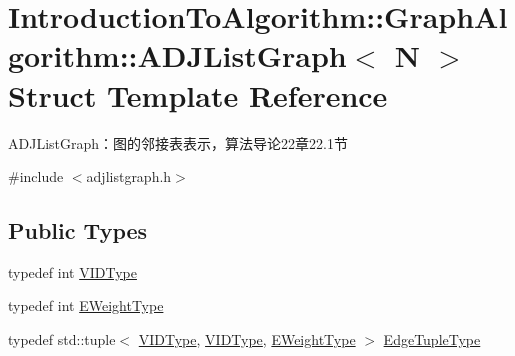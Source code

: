 \hypertarget{struct_introduction_to_algorithm_1_1_graph_algorithm_1_1_a_d_j_list_graph}{}\section{Introduction\+To\+Algorithm\+:\+:Graph\+Algorithm\+:\+:A\+D\+J\+List\+Graph$<$ N $>$ Struct Template Reference}
\label{struct_introduction_to_algorithm_1_1_graph_algorithm_1_1_a_d_j_list_graph}


A\+D\+J\+List\+Graph：图的邻接表表示，算法导论22章22.1节  




{\ttfamily \#include $<$adjlistgraph.\+h$>$}

\subsection*{Public Types}
\begin{DoxyCompactItemize}
\item 
typedef int \hyperlink{struct_introduction_to_algorithm_1_1_graph_algorithm_1_1_a_d_j_list_graph_aa42303d15a6a0e4cf6fad5c1327c1d79}{V\+I\+D\+Type}
\item 
typedef int \hyperlink{struct_introduction_to_algorithm_1_1_graph_algorithm_1_1_a_d_j_list_graph_a8b9518587536b482cfd8c2fc7f5c9678}{E\+Weight\+Type}
\item 
typedef std\+::tuple$<$ \hyperlink{struct_introduction_to_algorithm_1_1_graph_algorithm_1_1_a_d_j_list_graph_aa42303d15a6a0e4cf6fad5c1327c1d79}{V\+I\+D\+Type}, \hyperlink{struct_introduction_to_algorithm_1_1_graph_algorithm_1_1_a_d_j_list_graph_aa42303d15a6a0e4cf6fad5c1327c1d79}{V\+I\+D\+Type}, \hyperlink{struct_introduction_to_algorithm_1_1_graph_algorithm_1_1_a_d_j_list_graph_a8b9518587536b482cfd8c2fc7f5c9678}{E\+Weight\+Type} $>$ \hyperlink{struct_introduction_to_algorithm_1_1_graph_algorithm_1_1_a_d_j_list_graph_a6757574602df8359b10e37079c789eb6}{Edge\+Tuple\+Type}
\end{DoxyCompactItemize}
